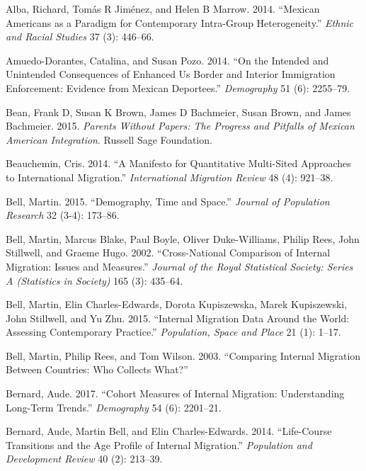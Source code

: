 \documentclass[
]{article}
\begin{document}
\leavevmode\hypertarget{ref-alba2014mexican}{}%
Alba, Richard, Tomás R Jiménez, and Helen B Marrow. 2014. ``Mexican
Americans as a Paradigm for Contemporary Intra-Group Heterogeneity.''
\emph{Ethnic and Racial Studies} 37 (3): 446--66.

\leavevmode\hypertarget{ref-amuedo2014intended}{}%
Amuedo-Dorantes, Catalina, and Susan Pozo. 2014. ``On the Intended and
Unintended Consequences of Enhanced Us Border and Interior Immigration
Enforcement: Evidence from Mexican Deportees.'' \emph{Demography} 51
(6): 2255--79.

\leavevmode\hypertarget{ref-bean2015parents}{}%
Bean, Frank D, Susan K Brown, James D Bachmeier, Susan Brown, and James
Bachmeier. 2015. \emph{Parents Without Papers: The Progress and Pitfalls
of Mexican American Integration}. Russell Sage Foundation.

\leavevmode\hypertarget{ref-beauchemin2014manifesto}{}%
Beauchemin, Cris. 2014. ``A Manifesto for Quantitative Multi-Sited
Approaches to International Migration.'' \emph{International Migration
Review} 48 (4): 921--38.

\leavevmode\hypertarget{ref-bell2015demography}{}%
Bell, Martin. 2015. ``Demography, Time and Space.'' \emph{Journal of
Population Research} 32 (3-4): 173--86.

\leavevmode\hypertarget{ref-bell2002cross}{}%
Bell, Martin, Marcus Blake, Paul Boyle, Oliver Duke-Williams, Philip
Rees, John Stillwell, and Graeme Hugo. 2002. ``Cross-National Comparison
of Internal Migration: Issues and Measures.'' \emph{Journal of the Royal
Statistical Society: Series A (Statistics in Society)} 165 (3): 435--64.

\leavevmode\hypertarget{ref-bell2015internal}{}%
Bell, Martin, Elin Charles-Edwards, Dorota Kupiszewska, Marek
Kupiszewski, John Stillwell, and Yu Zhu. 2015. ``Internal Migration Data
Around the World: Assessing Contemporary Practice.'' \emph{Population,
Space and Place} 21 (1): 1--17.

\leavevmode\hypertarget{ref-bell2003comparing}{}%
Bell, Martin, Philip Rees, and Tom Wilson. 2003. ``Comparing Internal
Migration Between Countries: Who Collects What?''

\leavevmode\hypertarget{ref-bernard2017cohort}{}%
Bernard, Aude. 2017. ``Cohort Measures of Internal Migration:
Understanding Long-Term Trends.'' \emph{Demography} 54 (6): 2201--21.

\leavevmode\hypertarget{ref-bernard2014life}{}%
Bernard, Aude, Martin Bell, and Elin Charles-Edwards. 2014.
``Life-Course Transitions and the Age Profile of Internal Migration.''
\emph{Population and Development Review} 40 (2): 213--39.
\end{document}
